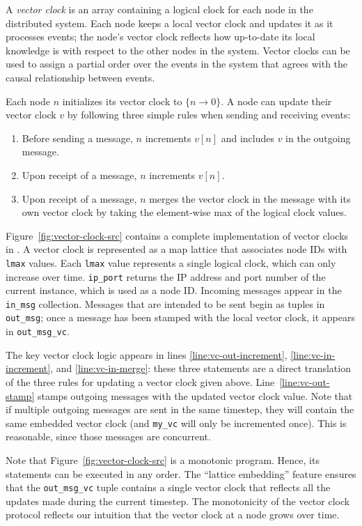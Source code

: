A \emph{vector clock} is an array containing a logical clock for each node in
the distributed system. Each node keeps a local vector clock and updates it as
it processes events; the node's vector clock reflects how up-to-date its local
knowledge is with respect to the other nodes in the system. Vector clocks can be
used to assign a partial order over the events in the system that agrees with
the causal relationship between events.

Each node $n$ initializes its vector clock to $\{n \rightarrow 0\}$. A node can
update their vector clock $v$ by following three simple rules when sending and
receiving events:
\begin{enumerate}
\item
  Before sending a message, $n$ increments $v[n]$ and includes $v$ in the
  outgoing message.
\item
  Upon receipt of a message, $n$ increments $v[n]$.
\item
  Upon receipt of a message, $n$ merges the vector clock in the message with its
  own vector clock by taking the element-wise max of the logical clock values.
\end{enumerate}

Figure~\ref{fig:vector-clock-src} contains a complete implementation of vector
clocks in \lang. A vector clock is represented as a map lattice that associates
node IDs with \texttt{lmax} values. Each \texttt{lmax} value represents a single
logical clock, which can only increase over time. \texttt{ip\_port} returns the
IP address and port number of the current \lang instance, which is used as a
node ID. Incoming messages appear in the \texttt{in\_msg} collection. Messages
that are intended to be sent begin as tuples in \texttt{out\_msg}; once a
message has been stamped with the local vector clock, it appears in
\texttt{out\_msg\_vc}.

The key vector clock logic appears in lines \ref{line:vc-out-increment},
\ref{line:vc-in-increment}, and \ref{line:vc-in-merge}: these three statements
are a direct translation of the three rules for updating a vector clock given
above. Line~\ref{line:vc-out-stamp} stamps outgoing messages with the updated
vector clock value.  Note that if multiple outgoing messages are sent in the
same timestep, they will contain the same embedded vector clock (and
\texttt{my\_vc} will only be incremented once). This is reasonable, since those
messages are concurrent.

Note that Figure~\ref{fig:vector-clock-src} is a monotonic program. Hence, its
statements can be executed in any order. The ``lattice embedding'' feature
ensures that the \texttt{out\_msg\_vc} tuple contains a single vector clock that
reflects all the updates made during the current timestep. The monotonicity of
the vector clock protocol reflects our intuition that the vector clock at a node
grows over time.%

